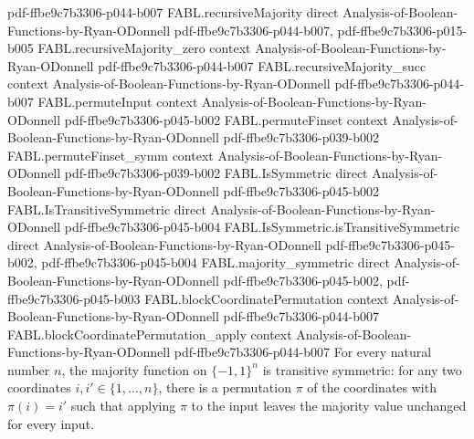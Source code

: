 \begin{theorem}
  {pdf-ffbe9c7b3306-p044-b007}
\proofstep
  {FABL.recursiveMajority}
  {direct}
  {Analysis-of-Boolean-Functions-by-Ryan-ODonnell}
  {pdf-ffbe9c7b3306-p044-b007,
    pdf-ffbe9c7b3306-p015-b005}
\proofstep
  {FABL.recursiveMajority_zero}
  {context}
  {Analysis-of-Boolean-Functions-by-Ryan-ODonnell}
  {pdf-ffbe9c7b3306-p044-b007}
\proofstep
  {FABL.recursiveMajority_succ}
  {context}
  {Analysis-of-Boolean-Functions-by-Ryan-ODonnell}
  {pdf-ffbe9c7b3306-p044-b007}
\proofstep
  {FABL.permuteInput}
  {context}
  {Analysis-of-Boolean-Functions-by-Ryan-ODonnell}
  {pdf-ffbe9c7b3306-p045-b002}
\proofstep
  {FABL.permuteFinset}
  {context}
  {Analysis-of-Boolean-Functions-by-Ryan-ODonnell}
  {pdf-ffbe9c7b3306-p039-b002}
\proofstep
  {FABL.permuteFinset_symm}
  {context}
  {Analysis-of-Boolean-Functions-by-Ryan-ODonnell}
  {pdf-ffbe9c7b3306-p039-b002}
\proofstep
  {FABL.IsSymmetric}
  {direct}
  {Analysis-of-Boolean-Functions-by-Ryan-ODonnell}
  {pdf-ffbe9c7b3306-p045-b002}
\proofstep
  {FABL.IsTransitiveSymmetric}
  {direct}
  {Analysis-of-Boolean-Functions-by-Ryan-ODonnell}
  {pdf-ffbe9c7b3306-p045-b004}
\proofstep
  {FABL.IsSymmetric.isTransitiveSymmetric}
  {direct}
  {Analysis-of-Boolean-Functions-by-Ryan-ODonnell}
  {pdf-ffbe9c7b3306-p045-b002,
    pdf-ffbe9c7b3306-p045-b004}
\proofstep
  {FABL.majority_symmetric}
  {direct}
  {Analysis-of-Boolean-Functions-by-Ryan-ODonnell}
  {pdf-ffbe9c7b3306-p045-b002,
    pdf-ffbe9c7b3306-p045-b003}
\proofstep
  {FABL.blockCoordinatePermutation}
  {context}
  {Analysis-of-Boolean-Functions-by-Ryan-ODonnell}
  {pdf-ffbe9c7b3306-p044-b007}
\proofstep
  {FABL.blockCoordinatePermutation_apply}
  {context}
  {Analysis-of-Boolean-Functions-by-Ryan-ODonnell}
  {pdf-ffbe9c7b3306-p044-b007}
For every natural number $n$, the majority function on $\{-1,1\}^n$ is transitive
symmetric: for any two coordinates $i,i'\in\{1,\ldots,n\}$, there is a permutation
$\pi$ of the coordinates with $\pi(i)=i'$ such that applying $\pi$ to the input
leaves the majority value unchanged for every input.
\end{theorem}

